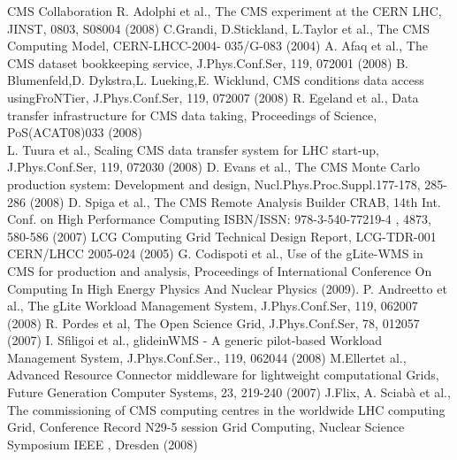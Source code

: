 \begin{thebibliography}{}
%
%
CMS Collaboration R. Adolphi et al., The CMS experiment at the CERN LHC, JINST, 0803, S08004 (2008)
%
C.Grandi, D.Stickland, L.Taylor et al., The CMS Computing Model, CERN-LHCC-2004-
035/G-083 (2004)
%
A. Afaq et al., The CMS dataset bookkeeping service, J.Phys.Conf.Ser, 119, 072001 (2008)
%
B. Blumenfeld,D. Dykstra,L. Lueking,E. Wicklund, CMS conditions data access usingFroNTier, J.Phys.Conf.Ser, 119, 072007 (2008)
%
R. Egeland et al., Data transfer infrastructure for CMS data taking, Proceedings of Science, PoS(ACAT08)033 (2008)\\
L. Tuura et al., Scaling CMS data transfer system for LHC start-up, J.Phys.Conf.Ser, 119, 072030 (2008)
%
D. Evans et al., The CMS Monte Carlo production system: Development and design, Nucl.Phys.Proc.Suppl.177-178, 285-286 (2008)
%
D. Spiga et al., The CMS Remote Analysis Builder CRAB, 14th Int. Conf. on High Performance Computing ISBN/ISSN: 978-3-540-77219-4 , 4873, 580-586 (2007)
%
LCG Computing Grid Technical Design Report, LCG-TDR-001 CERN/LHCC 2005-024 (2005)
%
G. Codispoti et al., Use of the gLite-WMS in CMS for production and analysis, Proceedings of International Conference On Computing In High Energy Physics And Nuclear Physics (2009). 
%
 P. Andreetto et al., The gLite Workload Management System, J.Phys.Conf.Ser, 119, 062007 (2008)
%
 R. Pordes et al, The Open Science Grid, J.Phys.Conf.Ser, 78, 012057 (2007)
%
 I. Sfiligoi et al., glideinWMS - A generic pilot-based Workload Management System, J.Phys.Conf.Ser., 119, 062044 (2008)
%
 M.Ellertet al., Advanced Resource Connector middleware
  for lightweight computational Grids, Future Generation Computer Systems, 23, 219-240 (2007)
%
J.Flix, A. Sciab\`a et al., The commissioning of CMS computing centres in the worldwide LHC computing Grid, Conference Record N29-5 session Grid Computing, Nuclear Science Symposium IEEE , Dresden (2008)


\end{thebibliography}

